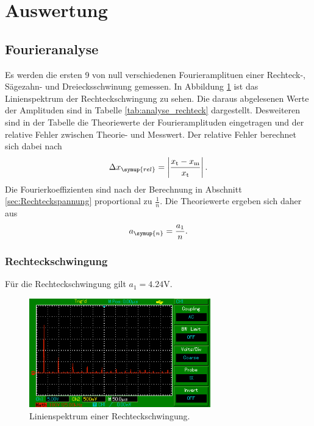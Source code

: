 \section{Auswertung}
\label{sec:Auswertung}
\subsection{Fourieranalyse}
Es werden die ersten 9 von null verschiedenen Fourieramplituen einer Rechteck-,
Sägezahn- und Dreiecksschwinung gemessen.
In Abbildung \ref{fig:linienspektrum_rechteck} ist das Linienspektrum der
Rechteckschwingung zu sehen. Die daraus abgelesenen Werte der Amplituden sind in
Tabelle \ref{tab:analyse_rechteck} dargestellt. Desweiteren sind in der Tabelle
die Theoriewerte der Fourieramplituden eingetragen und der relative Fehler
zwischen Theorie- und Messwert.
Der relative Fehler berechnet sich dabei nach
\begin{equation}
  \Delta x_\symup{rel} = \left|\frac{x_\text{t} - x_\text{m}}
  {x_\text{t}} \right|.
  \label{eqn:relativer_fehler}
\end{equation}
Die Fourierkoeffizienten sind nach der Berechnung in Abschnitt \ref{sec:Rechteckspannung}
proportional zu $\frac{1}{n}$. Die Theoriewerte ergeben sich daher aus
\begin{equation}
  a_\symup{n} = \frac{a_1}{n}.
  \label{eqn:a_n_rechteck}
\end{equation}

\subsubsection{Rechteckschwingung}
Für die Rechteckschwingung gilt $a_1 = 4.24 \si{\volt}$.
\begin{figure}
  \centering
  \includegraphics[width=0.7\textwidth]{linienspektrum_rechteck.png}
  \caption{Linienspektrum einer Rechteckschwingung.}
  \label{fig:linienspektrum_rechteck}
\end{figure}


